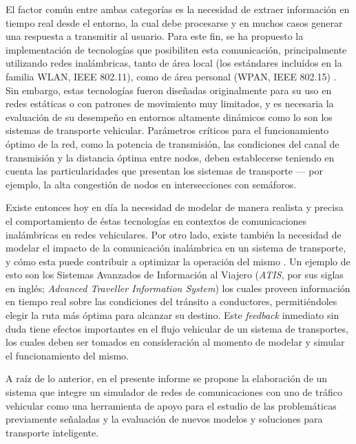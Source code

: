 El factor común entre ambas categorías es la necesidad de extraer información en tiempo real desde el entorno, la cual debe procesarse y en muchos casos generar una respuesta a transmitir al usuario. Para este fin, se ha propuesto la implementación de tecnologías que posibiliten esta comunicación, principalmente utilizando redes inalámbricas, tanto de área local (los estándares incluídos en la familia WLAN, IEEE 802.11), como de área personal (WPAN, IEEE 802.15) \cite{80211dailey,80215vanet,80211wave}. Sin embargo, estas tecnologías fueron diseñadas originalmente para su uso en redes estáticas o con patrones de movimiento muy limitados, y es necesaria la evaluación de su desempeño en entornos altamente dinámicos como lo son los sistemas de transporte vehicular. Parámetros críticos para el funcionamiento óptimo de la red, como la potencia de transmisión, las condiciones del canal de transmisión y la distancia óptima entre nodos, deben establecerse teniendo en cuenta las particularidades que presentan los sistemas de transporte --- por ejemplo, la alta congestión de nodos en intersecciones con semáforos.

Existe entonces hoy en día la necesidad de modelar de manera realista y precisa el comportamiento de éstas tecnologías en contextos de comunicaciones inalámbricas en redes vehiculares. Por otro lado, existe también la necesidad de modelar el impacto de la comunicación inalámbrica en un sistema de transporte, y cómo esta puede contribuir a optimizar la operación del mismo \cite{bidirectionalsimul}. Un ejemplo de esto son los Sistemas Avanzados de Información al Viajero (\textit{ATIS}, por sus siglas en inglés; \textit{Advanced Traveller Information System}) los cuales proveen información en tiempo real sobre las condiciones del tránsito a conductores, permitiéndoles elegir la ruta más óptima para alcanzar su destino. Este \textit{feedback} inmediato sin duda tiene efectos importantes en el flujo vehicular de un sistema de transportes, los cuales deben ser tomados en consideración al momento de modelar y simular el funcionamiento del mismo.

A raíz de lo anterior, en el presente informe se propone la elaboración de un sistema que integre un simulador de redes de comunicaciones con uno de tráfico vehicular como una herramienta de apoyo para el estudio de las problemáticas previamente señaladas y la evaluación de nuevos modelos y soluciones para transporte inteligente.
